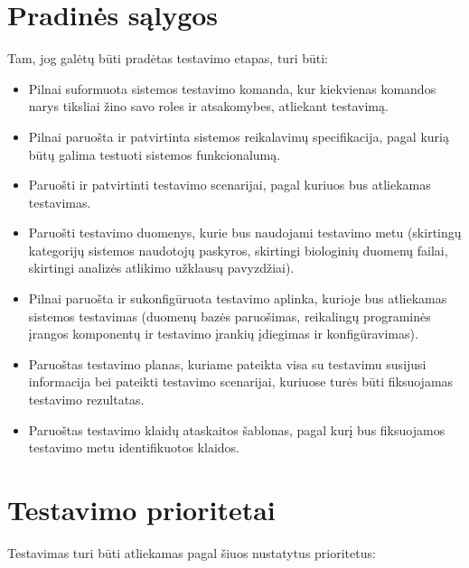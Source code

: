 \documentclass[12pt]{article}
\begin{document}
\newpage


\section{Pradinės sąlygos}
Tam, jog galėtų būti pradėtas testavimo etapas, turi būti:

\begin{itemize}
    \item Pilnai suformuota sistemos testavimo komanda, kur kiekvienas komandos
    narys tiksliai žino savo roles ir atsakomybes, atliekant testavimą.
    \item Pilnai paruošta ir patvirtinta sistemos reikalavimų specifikacija,
    pagal kurią būtų galima testuoti sistemos funkcionalumą.
    \item Paruošti ir patvirtinti testavimo scenarijai, pagal kuriuos bus
    atliekamas testavimas.
    \item Paruošti testavimo duomenys, kurie bus naudojami testavimo metu
    (skirtingų kategorijų sistemos naudotojų paskyros, skirtingi biologinių
    duomenų failai, skirtingi analizės atlikimo užklausų pavyzdžiai).
    \item Pilnai paruošta ir sukonfigūruota testavimo aplinka, kurioje bus
    atliekamas sistemos testavimas (duomenų bazės paruošimas, reikalingų
    programinės įrangos komponentų ir testavimo įrankių įdiegimas ir
    konfigūravimas).
    \item Paruoštas testavimo planas, kuriame pateikta visa su testavimu
    susijusi informacija bei pateikti testavimo scenarijai, kuriuose turės būti
    fiksuojamas testavimo rezultatas.
    \item Paruoštas testavimo klaidų ataskaitos šablonas, pagal kurį bus
    fiksuojamos testavimo metu identifikuotos klaidos.
\end{itemize}

\newpage


\section{Testavimo prioritetai}
Testavimas turi būti atliekamas pagal šiuos nustatytus prioritetus:
\end{document}
